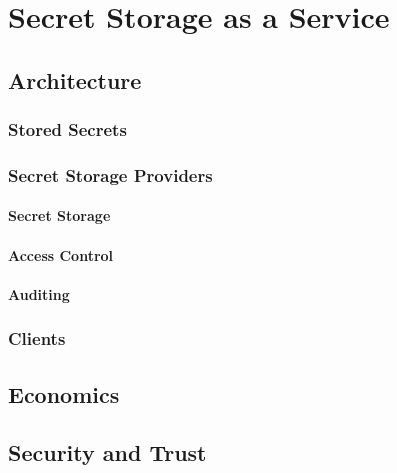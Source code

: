 \chapter{Secret Storage as a Service}
\label{chap:ssaas}

\section{Architecture}
\subsection{Stored Secrets}
\subsection{Secret Storage Providers}
\subsubsection{Secret Storage}
\subsubsection{Access Control}
\subsubsection{Auditing}
\subsection{Clients}
\section{Economics}
\section{Security and Trust}
